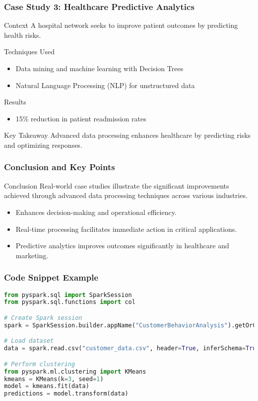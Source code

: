 \documentclass[aspectratio=169]{beamer}
\begin{document}
\begin{frame}[fragile]
    \frametitle{Case Study 3: Healthcare Predictive Analytics}
    \begin{block}{Context}
        A hospital network seeks to improve patient outcomes by predicting health risks.
    \end{block}
    \begin{block}{Techniques Used}
        \begin{itemize}
            \item Data mining and machine learning with Decision Trees
            \item Natural Language Processing (NLP) for unstructured data
        \end{itemize}
    \end{block}
    \begin{block}{Results}
        \begin{itemize}
            \item 15\% reduction in patient readmission rates
        \end{itemize}
    \end{block}
    \begin{block}{Key Takeaway}
        Advanced data processing enhances healthcare by predicting risks and optimizing responses.
    \end{block}
\end{frame}

\begin{frame}[fragile]
    \frametitle{Conclusion and Key Points}
    \begin{block}{Conclusion}
        Real-world case studies illustrate the significant improvements achieved through advanced data processing techniques across various industries.
    \end{block}
    \begin{itemize}
        \item Enhances decision-making and operational efficiency.
        \item Real-time processing facilitates immediate action in critical applications.
        \item Predictive analytics improves outcomes significantly in healthcare and marketing.
    \end{itemize}
\end{frame}

\begin{frame}[fragile]
    \frametitle{Code Snippet Example}
    \begin{lstlisting}[language=Python]
from pyspark.sql import SparkSession
from pyspark.sql.functions import col

# Create Spark session
spark = SparkSession.builder.appName("CustomerBehaviorAnalysis").getOrCreate()

# Load dataset
data = spark.read.csv("customer_data.csv", header=True, inferSchema=True)

# Perform clustering
from pyspark.ml.clustering import KMeans
kmeans = KMeans(k=3, seed=1)
model = kmeans.fit(data)
predictions = model.transform(data)
    \end{lstlisting}
\end{frame}
\end{document}
